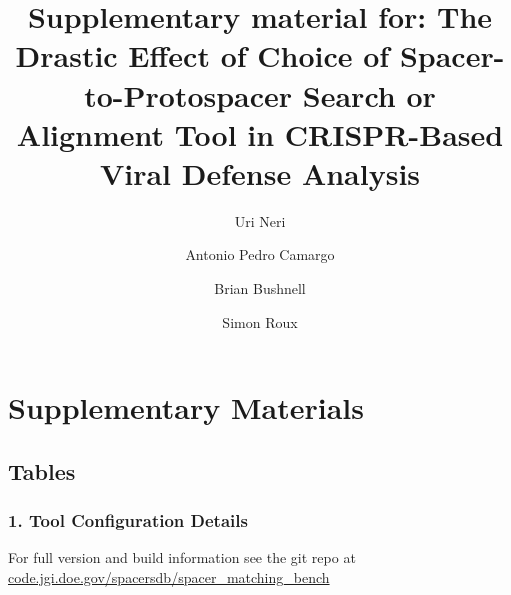 \documentclass[
]{article}
\title{Supplementary material for: The Drastic Effect of Choice of
Spacer-to-Protospacer Search or Alignment Tool in CRISPR-Based Viral
Defense Analysis}
\author{Uri Neri \and Antonio Pedro Camargo \and Brian
Bushnell \and Simon Roux}
\date{}
\begin{document}
\maketitle


\section{Supplementary Materials}\label{supplementary-materials}

\subsection{Tables}\label{tables}

\subsubsection{1. Tool Configuration
Details}\label{tool-configuration-details}

For full version and build information see the git repo at
\href{https://code.jgi.doe.gov/spacersdb/spacer_matching_bench}{code.jgi.doe.gov/spacersdb/spacer\_matching\_bench}
\end{document}
